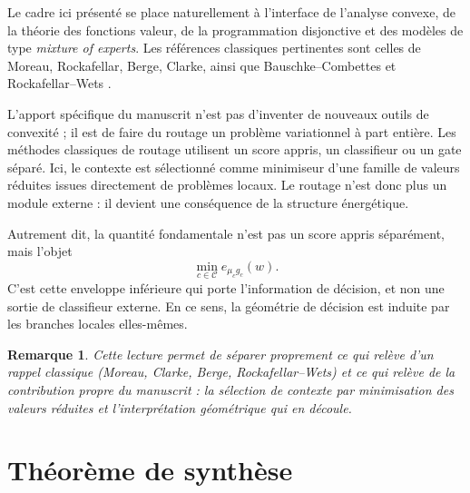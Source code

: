 \documentclass[11pt,a4paper]{article}
\newtheorem{remark}{Remarque}[section]
\newcommand{\Ccal}{\mathcal C}
\begin{document}
Le cadre ici présenté se place naturellement à l'interface de l'analyse convexe, de la théorie des fonctions valeur, de la programmation disjonctive et des modèles de type \emph{mixture of experts}. Les références classiques pertinentes sont celles de Moreau, Rockafellar, Berge, Clarke, ainsi que Bauschke--Combettes et Rockafellar--Wets \cite{Moreau1965,Rockafellar1970,Berge1963,Clarke1983,BauschkeCombettes2017,RockafellarWets1998}.

L'apport spécifique du manuscrit n'est pas d'inventer de nouveaux outils de convexité ; il est de faire du routage un problème variationnel à part entière. Les méthodes classiques de routage utilisent un score appris, un classifieur ou un gate séparé. Ici, le contexte est sélectionné comme minimiseur d'une famille de valeurs réduites issues directement de problèmes locaux. Le routage n'est donc plus un module externe : il devient une conséquence de la structure énergétique.

Autrement dit, la quantité fondamentale n'est pas un score appris séparément, mais l'objet
\[
\min_{c\in\Ccal} e_{\mu_c g_c}(w).
\]
C'est cette enveloppe inférieure qui porte l'information de décision, et non une sortie de classifieur externe. En ce sens, la géométrie de décision est induite par les branches locales elles-mêmes.

\begin{remark}
Cette lecture permet de séparer proprement ce qui relève d'un rappel classique (Moreau, Clarke, Berge, Rockafellar--Wets) et ce qui relève de la contribution propre du manuscrit : la sélection de contexte par minimisation des valeurs réduites et l'interprétation géométrique qui en découle.
\end{remark}

\section{Théorème de synthèse}
\end{document}

